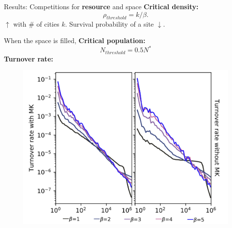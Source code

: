 \begin{frame}{Results: Competitions for \textbf{resource} and space}
    \textbf{Critical density:}
    \[\rho_{threshold} = k/\beta.\] $\uparrow$ with \# of cities $k$. Survival probability of a site $\downarrow$.
    
When the space is filled, \textbf{Critical population:}
    \[N_{threshold} = 0.5 N^*\]
\textbf{Turnover rate:}
\begin{figure}
    \centering
    \includegraphics[width = 0.65\linewidth]{Pics/in_one.jpeg}
    \label{fig:turnover}
\end{figure}

\end{frame}



    

